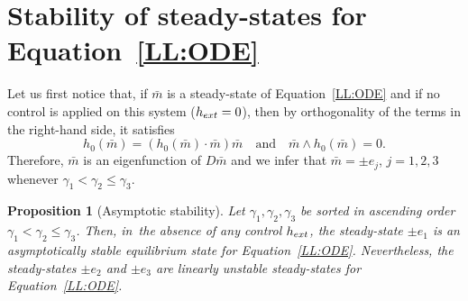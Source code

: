 \documentclass[10pt]{amsart}
\newtheorem{proposition}[theorem]{Proposition}
\theoremstyle{definition}
\begin{document}
\section{Stability of steady-states for Equation~\texorpdfstring{\eqref{LL:ODE}}{(3)}}\label{append:e1AS}
Let us first notice that, if $\bar m$ is a steady-state of Equation~\eqref{LL:ODE} and if no control is applied on this system ($h_{\rm ext}=0$), then by orthogonality of the terms in the right-hand side, it satisfies
\[
h_0(\bar m)=(h_0(\bar m)\cdot \bar m)\bar m\quad \text{and}\quad \bar m\wedge h_0(\bar m)=0.
\]
Therefore, $\bar m$ is an eigenfunction of $D\bar m$ and we infer that $\bar m=\pm e_j$, $j=1,2,3$ whenever $\gamma_1<\gamma_2\leq \gamma_3$.
\begin{proposition}[Asymptotic stability] \label{prop:asympt_stab}
Let $\gamma_1, \gamma_2, \gamma_3$ be sorted in ascending order $\gamma_1<\gamma_2\leq\gamma_3$. Then, in~the absence of any control $h_{\rm ext}$, the steady-state $\pm e_1$ is an asymptotically stable equilibrium state for Equation~\eqref{LL:ODE}. Nevertheless, the steady-states $\pm e_2$ and $\pm e_3$ are linearly unstable steady-states for Equation~\eqref{LL:ODE}.
\end{proposition}
\end{document}
